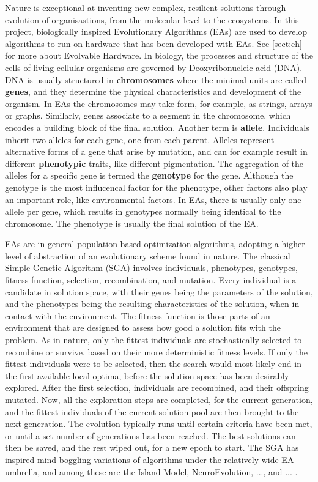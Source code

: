 Nature is exceptional at inventing new complex, resilient solutions through evolution of organisastions, from the molecular level to the ecosystems.
In this project, biologically inspired Evolutionary Algorithms (EAs) are used to develop algorithms to run on hardware that has been developed with EAs.
See \vref{sect:eh} for more about Evolvable Hardware.
In biology, the processes and structure of the cells of living cellular organisms are governed by Deoxyribonucleic acid (DNA).
DNA is usually structured in \textbf{chromosomes} where the minimal units are called \textbf{genes}, and they determine the physical characteristics and development of the organism.
In EAs the chromosomes may take form, for example, as strings, arrays or graphs.
Similarly, genes associate to a segment in the chromosome, which encodes a building block of the final solution.
Another term is \textbf{allele}. Individuals inherit two alleles for each gene, one from each parent. Alleles represent alternative forms of a gene that arise by mutation, and can for example result in different \textbf{phenotypic} traits, like different pigmentation.
The aggregation of the alleles for a specific gene is termed the \textbf{genotype} for the gene.
Although the genotype is the most influcencal factor for the phenotype, other factors also play an important role, like environmental factors.
\cite{trefzer_evolvable_2015}
In EAs, there is usually only one allele per gene, which results in genotypes normally being identical to the chromosome.
The phenotype is usually the final solution of the EA.

EAs are in general population-based optimization algorithms, adopting a higher-level of abstraction of an evolutionary scheme found in nature.
The classical Simple Genetic Algorithm (SGA) involves individuals, phenotypes, genotypes, fitness function, selection, recombination, and mutation.
Every individual is a candidate in solution space, with their genes being the parameters of the solution, and the phenotypes being the resulting characteristics of the solution, when in contact with the environment.
The fitness function is those parts of an environment that are designed to assess how good a solution fits with the problem.
As in nature, only the fittest individuals are stochastically selected to recombine or survive, based on their more deterministic fitness levels.
If only the fittest individuals were to be selected, then the search would most likely end in the first available local optima,
before the solution space has been desirably explored. After the first selection, individuals are recombined, and their offspring mutated.
Now, all the exploration steps are completed, for the current generation, and the fittest individuals of the current solution-pool are then brought to the next generation.
The evolution typically runs until certain criteria have been met, or until a set number of generations has been reached.
The best solutions can then be saved, and the rest wiped out, for a new epoch to start. \cite{eiben_introduction_2015}
The SGA has inspired mind-boggling variations of algorithms under the relatively wide EA umbrella, and among these are the
Island Model, NeuroEvolution, ..., and ... .

